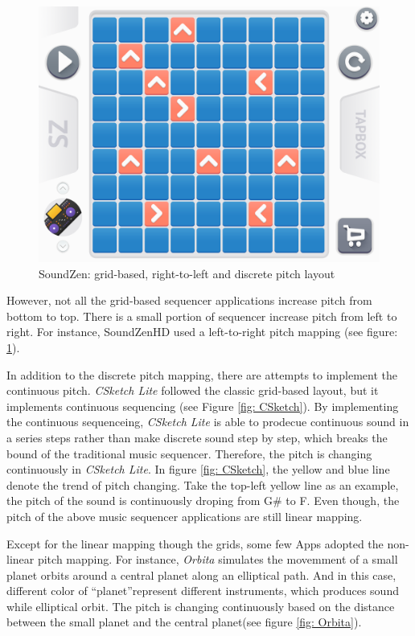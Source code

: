  \bigskip
 \begin{figure}[h]
   \includegraphics[width=12 cm]{images/SoundZen.PNG}
   \centering
   \caption{SoundZen: grid-based, right-to-left and discrete pitch layout}
   \label{fig: SoundZen}
 \end{figure}
 \bigskip

 However, not all the grid-based sequencer applications increase pitch from bottom to top. There is a small portion of sequencer increase pitch from left to right. For instance, SoundZenHD used a left-to-right pitch mapping (see figure: \ref{fig: SoundZen}).

In addition to the discrete pitch mapping, there are attempts to implement the continuous pitch. \textit{CSketch Lite} followed the classic grid-based layout, but it implements continuous sequencing (see Figure \ref{fig: CSketch}). By implementing the continuous sequenceing, \textit{CSketch Lite} is able to prodecue continuous sound in a series steps rather than make discrete sound step by step, which breaks the bound of the traditional music sequencer. Therefore, the pitch is changing continuously in \textit{CSketch Lite}. In figure \ref{fig: CSketch}, the yellow and blue line denote the trend of pitch changing. Take the top-left yellow line as an example, the pitch of the sound is continuously droping from G$\#$ to F. Even though, the pitch of the above music sequencer applications are still linear mapping.

Except for the linear mapping though the grids, some few Apps adopted the non-linear pitch mapping. For instance, \textit{Orbita} simulates the movemment of a small planet orbits around a central planet along an elliptical path. And in this case, different color of \textquotedblleft{planet}\textquotedblright represent different instruments, which produces sound while elliptical orbit. The pitch is changing continuously based on the distance between the small planet and the central planet(see figure \ref{fig: Orbita}).

